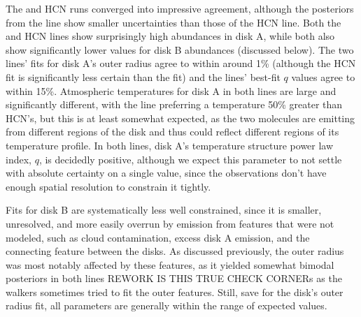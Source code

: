 
The \hco and HCN runs converged into impressive agreement, although the posteriors from the \hco line show smaller uncertainties than those of the HCN line. Both the \hco and HCN lines show surprisingly high abundances in disk A, while both also show significantly lower values for disk B abundances (discussed below). The two lines' fits for disk A's outer radius agree to within around 1\% (although the HCN fit is significantly less certain than the \hco fit) and the lines' best-fit $q$ values agree to within 15\%. Atmospheric temperatures for disk A in both lines are large and significantly different, with the \hco line preferring a temperature 50\% greater than HCN's, but this is at least somewhat expected, as the two molecules are emitting from different regions of the disk and thus could reflect different regions of its temperature profile. In both lines, disk A's temperature structure power law index, $q$, is decidedly positive, although we expect this parameter to not settle with absolute certainty on a single value, since the observations don't have enough spatial resolution to constrain it tightly.




Fits for disk B are systematically less well constrained, since it is smaller, unresolved, and more easily overrun by emission from features that were not modeled, such as cloud contamination, excess disk A emission, and the connecting feature between the disks. As discussed previously, the outer radius was most notably affected by these features, as it yielded somewhat bimodal posteriors in both lines REWORK IS THIS TRUE CHECK CORNERs as the walkers sometimes tried to fit the outer features. Still, save for the disk's outer radius fit, all parameters are generally within the range of expected values.



